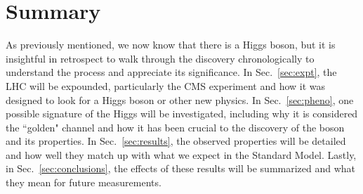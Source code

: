 \section{Summary}
\label{sec:intro_summary}

As previously mentioned, we now know that there is a Higgs boson, but it is insightful in retrospect to walk through the discovery chronologically to understand the process and appreciate its significance. In Sec.~\ref{sec:expt}, the LHC will be expounded, particularly the CMS experiment and how it was designed to look for a Higgs boson or other new physics. In Sec.~\ref{sec:pheno}, one possible signature of the Higgs will be investigated, including why it is considered the ``golden" channel and how it has been crucial to the discovery of the boson and its properties. In Sec.~\ref{sec:results}, the observed properties will be detailed and how well they match up with what we expect in the Standard Model. Lastly, in Sec.~\ref{sec:conclusions}, the effects of these results will be summarized and what they mean for future measurements.